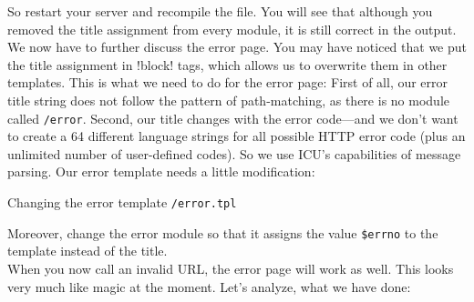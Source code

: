 \documentclass{scrartcl}
\begin{document}
      So restart your server and recompile the file. You will see that although you removed the title assignment from every module, it is still correct in the output. \\
      We now have to further discuss the error page. You may have noticed that we put the title assignment in \smarty!{block}! tags, which allows us to overwrite them in other templates. This is what we need to do for the error page: First of all, our error title string does not follow the pattern of path-matching, as there is no module called \texttt{/error}. Second, our title changes with the error code---and we don't want to create a 64 different language strings for all possible HTTP error code (plus an unlimited number of user-defined codes). So we use ICU's capabilities of message parsing. Our error template needs a little modification:
      \begin{listing}[H]
         \caption{Changing the error template \texttt{/error.tpl}}
      \end{listing}
      Moreover, change the error module so that it assigns the value \lstinline!$errno! to the template instead of the title. \\
      When you now call an invalid URL, the error page will work as well. This looks very much like magic at the moment. Let's analyze, what we have done:
\end{document}

